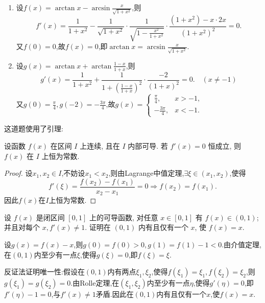 \begin{solution}
    \begin{enumerate}
        \item 设$f(x) = \arctan x - \arcsin\frac{x}{\sqrt{1+x^2}}$,则
              $$
                  f'(x) = \frac{1}{1+x^2} - \frac{1}{\sqrt{1+x^2}} \cdot \frac{1}{\sqrt{1-\frac{x^2}{1+x^2}}} \cdot \frac{(1+x^2) - x \cdot 2x}{(1+x^2)^2} = 0.
              $$
              又$f(0) = 0$,故$f(x) = 0$,即$\arctan x = \arcsin\frac{x}{\sqrt{1+x^2}}$.
        \item 设$g(x) = \arctan x + \arctan\frac{1-x}{1+x}$,则
              $$
                  g'(x) = \frac{1}{1+x^2} + \frac{1}{1+\left(\frac{1-x}{1+x}\right)^2} \cdot \frac{-2}{(1+x)^2} = 0. \quad (x \ne -1)
              $$
              又$g(0) = \frac{\pi}{4},g(-2) = -\frac{3\pi}{4}$,故$g(x) = \begin{cases} \frac{\pi}{4}, & x > -1, \\ -\frac{3\pi}{4}, & x < -1. \end{cases}$
    \end{enumerate}
\end{solution}

这道题使用了引理:
\begin{lemma*}
    设函数 $f(x)$ 在区间 $I$ 上连续, 且在 $I$ 内部可导. 若 $f'(x)=0$ 恒成立, 则 $f(x)$ 在 $I$ 上恒为常数.
\end{lemma*}

\begin{proof}
    设$x_1,x_2 \in I$,不妨设$x_1 < x_2$,则由Lagrange中值定理,$\exists \xi \in (x_1,x_2)$,使得
    $$
        f'(\xi) = \frac{f(x_2)-f(x_1)}{x_2-x_1} = 0 \Rightarrow f(x_2) = f(x_1).
    $$
    因此$f(x)$在$I$上恒为常数.
\end{proof}

\begin{exercise}[3.3.6]
    设 $f(x)$ 是闭区间 $[0,1]$ 上的可导函数, 对任意 $x \in [0,1]$ 有 $f(x) \in (0,1)$; 并且对每个 $x, f'(x) \ne 1$. 证明在 $(0,1)$ 内有且仅有一个 $x$, 使 $f(x)=x$.
\end{exercise}

\begin{solution}
    设$g(x) = f(x) - x$,则$g(0) = f(0) > 0, g(1) = f(1) - 1 < 0$.由介值定理,在$(0,1)$内至少有一点$\xi$,使得$g(\xi) = 0$,即$f(\xi) = \xi$.

    反证法证明唯一性:假设在$(0,1)$内有两点$\xi_1,\xi_2$,使得$f(\xi_1) = \xi_1,f(\xi_2) = \xi_2$,则$g(\xi_1) = g(\xi_2) = 0$.由Rolle定理,在$(\xi_1,\xi_2)$内至少有一点$\eta$,使得$g'(\eta) = 0$,即$f'(\eta) - 1 = 0$,与$f'(x) \ne 1$矛盾.因此在$(0,1)$内有且仅有一个$x$,使$f(x) = x$.
\end{solution}


